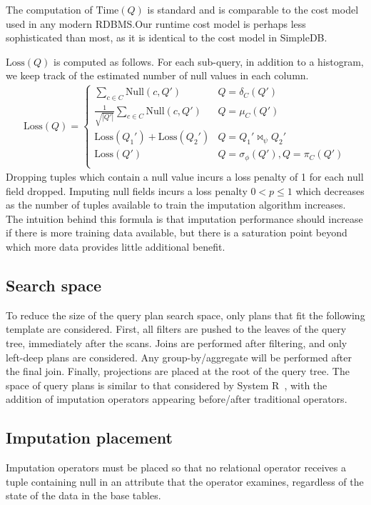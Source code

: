 The computation of $\text{Time}(Q)$ is standard and is comparable to the cost model used in any modern RDBMS.\@ Our runtime cost model is perhaps less sophisticated than most, as it is identical to the cost model in SimpleDB.

$\text{Loss}(Q)$ is computed as follows.
For each sub-query, in addition to a histogram, we keep track of the estimated number of null values in each column.
\begin{align*}
  \text{Loss}(Q) = \begin{cases}
    \sum_{c \in C} \text{Null}(c, Q') & Q = \delta_C(Q') \\
    \frac{1}{\sqrt{|Q'|}} \sum_{c \in C} \text{Null}(c, Q') & Q = \mu_C(Q') \\
    \text{Loss}(Q_1') + \text{Loss}(Q_2') & Q = Q_1' \bowtie_\psi Q_2' \\
    \text{Loss}(Q') & Q = \sigma_\phi(Q'), Q = \pi_C(Q') \\
  \end{cases}
\end{align*}
Dropping tuples which contain a null value incurs a loss penalty of 1 for each null field dropped.
Imputing null fields incurs a loss penalty $0 < p \leq 1$ which decreases as the number of tuples available to train the imputation algorithm increases.
The intuition behind this formula is that imputation performance should increase if there is more training data available, but there is a saturation point beyond which more data provides little additional benefit.

\subsection{Search space}
\label{sec:search-space}
To reduce the size of the query plan search space, only plans that fit the following template are considered. First, all filters are pushed to the leaves of the query tree, immediately after the scans. Joins are performed after filtering, and only left-deep plans are considered. Any group-by/aggregate will be performed after the final join. Finally, projections are placed at the root of the query tree. The space of query plans is similar to that considered by System R~\cite{blasgen1981system}, with the addition of imputation operators appearing before/after traditional operators.

\subsection{Imputation placement}
\label{sec:placement}
Imputation operators must be placed so that no relational operator receives a tuple containing null in an attribute that the operator examines, regardless of the state of the data in the base tables.

